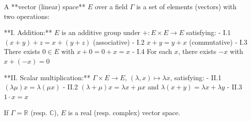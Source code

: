 A **vector (linear) space** $E$ over a field $\Gamma$ is a set of elements (vectors) with two operations:

**I. Addition:** $E$ is an additive group under $+: E \times E \to E$ satisfying:
- I.1 $(x+y)+z = x+(y+z)$ (associative)
- I.2 $x+y = y+x$ (commutative)
- I.3 There exists $0 \in E$ with $x+0 = 0+x = x$
- I.4 For each $x$, there exists $-x$ with $x+(-x)=0$

**II. Scalar multiplication:** $\Gamma \times E \to E$, $(\lambda, x) \mapsto \lambda x$, satisfying:
- II.1 $(\lambda\mu)x = \lambda(\mu x)$
- II.2 $(\lambda+\mu)x = \lambda x + \mu x$ and $\lambda(x+y) = \lambda x + \lambda y$
- II.3 $1 \cdot x = x$

If $\Gamma = \mathbb{R}$ (resp. $\mathbb{C}$), $E$ is a real (resp. complex) vector space.
